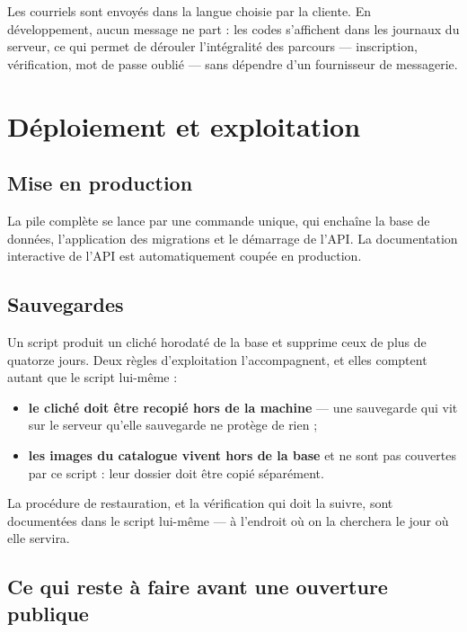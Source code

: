 
Les courriels sont envoyés dans la langue choisie par la cliente. En
développement, aucun message ne part : les codes s'affichent dans les journaux
du serveur, ce qui permet de dérouler l'intégralité des parcours --- inscription,
vérification, mot de passe oublié --- sans dépendre d'un fournisseur de
messagerie.

\section{Déploiement et exploitation}

\subsection{Mise en production}

La pile complète se lance par une commande unique, qui enchaîne la base de
données, l'application des migrations et le démarrage de l'API. La
documentation interactive de l'API est automatiquement coupée en production.

\subsection{Sauvegardes}

Un script produit un cliché horodaté de la base et supprime ceux de plus de
quatorze jours. Deux règles d'exploitation l'accompagnent, et elles comptent
autant que le script lui-même :

\begin{itemize}[leftmargin=1.2cm]
  \item \textbf{le cliché doit être recopié hors de la machine} --- une
  sauvegarde qui vit sur le serveur qu'elle sauvegarde ne protège de rien ;
  \item \textbf{les images du catalogue vivent hors de la base} et ne sont pas
  couvertes par ce script : leur dossier doit être copié séparément.
\end{itemize}

La procédure de restauration, et la vérification qui doit la suivre, sont
documentées dans le script lui-même --- à l'endroit où on la cherchera le jour
où elle servira.

\subsection{Ce qui reste à faire avant une ouverture publique}

